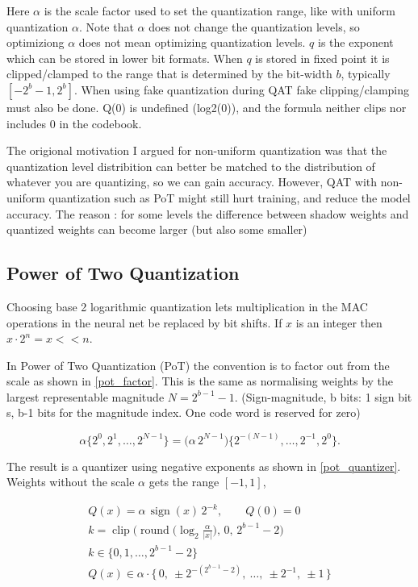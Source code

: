 Here $\alpha$ is the scale factor used to set the quantization range, like with uniform quantization $\alpha$.
Note that $\alpha$ does not change the quantization levels, so optimiziong $\alpha$ does not mean optimizing quantization levels.
$q$ is the exponent which can be stored in lower bit formats. 
When $q$ is stored in fixed point it is clipped/clamped to the range that is determined by the bit-width $b$, typically $[-2^b - 1, 2^b]$.
When using fake quantization during QAT fake clipping/clamping must also be done.
Q(0) is undefined (log2(0)), and the formula neither clips nor includes 0 in the codebook.


The origional motivation I argued for non-uniform quantization was that the quantization level distribition can better be matched to 
the distribution of whatever you are quantizing, so we can gain accuracy.
However, QAT with non-uniform quantization such as PoT might still hurt training, and reduce the model accuracy.
The reason : for some levels the difference between shadow weights and quantized weights can become larger (but also some smaller)


\subsection{Power of Two Quantization}

Choosing base 2 logarithmic quantization lets multiplication in the MAC operations in the neural net be replaced by bit shifts.
If $x$ is an integer then $x \cdot 2^{n} = x << n$.

In Power of Two Quantization (PoT) the convention is to factor out from the scale as shown in \eqref{pot_factor}.
This is the same as normalising weights by the largest representable magnitude $N = 2^{b-1}-1$.
(Sign-magnitude, b bits: 1 sign bit s, b-1 bits for the magnitude index. One code word is reserved for zero)

\begin{equation} \label{pot_factor}
    \alpha\big\{2^{0},2^{1},\dots,2^{N-1}\big\}
    = \big(\alpha\,2^{N-1}\big)\big\{2^{-(N-1)},\dots,2^{-1},2^{0}\big\}.
\end{equation}

The result is a quantizer using negative exponents as shown in \eqref{pot_quantizer}.
Weights without the scale $\alpha$ gets the range $[-1, 1]$,

\begin{gather} \label{pot_quantizer}
    Q(x) = \alpha\,\operatorname{sign}(x)\,2^{-k}, \qquad Q(0)=0 \\[2pt]
    k = \operatorname{clip}\!\Big(\operatorname{round}\big(\log_2\tfrac{\alpha}{|x|}\big),\,0,\,2^{b-1}-2\Big) \\[2pt]
    k \in \{0, 1, \dots, 2^{b-1}-2\} \\[2pt]
    Q(x) \in \alpha\cdot\{\,0,\ \pm 2^{-(2^{b-1}-2)},\ \dots,\ \pm 2^{-1},\ \pm 1\,\}
\end{gather}

